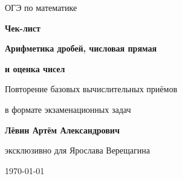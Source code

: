 \documentclass[a4paper,12pt]{article}
\begin{document}

\begin{titlepage}
\thispagestyle{empty}
\centering

\vspace*{22mm}

{\Large\color{softgray}ОГЭ по математике\par}

\vspace{12mm}

{\fontsize{32}{38}\selectfont
\bfseries
\color{darkaccent}
Чек-лист
\par}

\vspace{5mm}

{\LARGE\bfseries
Арифметика дробей, числовая прямая
\par}

\vspace{2mm}

{\LARGE\bfseries
и оценка чисел
\par}

\vspace{18mm}

{\large
Повторение базовых вычислительных приёмов
\par}

{\large
в формате экзаменационных задач
\par}

\vfill

{\large\bfseries
Лёвин Артём Александрович
\par}

\vspace{2mm}

{\large
эксклюзивно для Ярослава Верещагина
\par}

\vspace{8mm}

{\large
\today
\par}

\vspace{16mm}


\end{titlepage}
\end{document}
